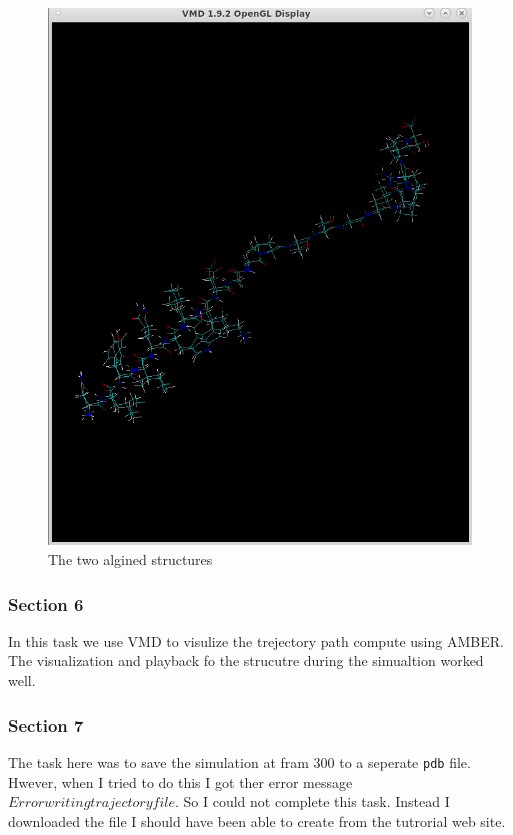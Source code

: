 \documentclass[11pt]{article}
\makeatletter
\def\maxwidth{\ifdim\Gin@nat@width>\linewidth\linewidth
    \else\Gin@nat@width\fi}
\let\Oldincludegraphics\includegraphics
\renewcommand{\includegraphics}[1]{\Oldincludegraphics[width=.8\maxwidth]{#1}}
\makeatother
\begin{document}
\begin{figure}
\centering
\includegraphics{Screenshot_algined.png}
\caption{The two algined structures}
\end{figure}

\subsubsection{Section 6}\label{section-6}

In this task we use VMD to visulize the trejectory path compute using
AMBER. The visualization and playback fo the strucutre during the
simualtion worked well.

\subsubsection{Section 7}\label{section-7}

The task here was to save the simulation at fram 300 to a seperate
\texttt{pdb} file. Hwever, when I tried to do this I got ther error
message \(Error writing trajectory file\). So I could not complete this
task. Instead I downloaded the file I should have been able to create
from the tutrorial web site.
\end{document}

